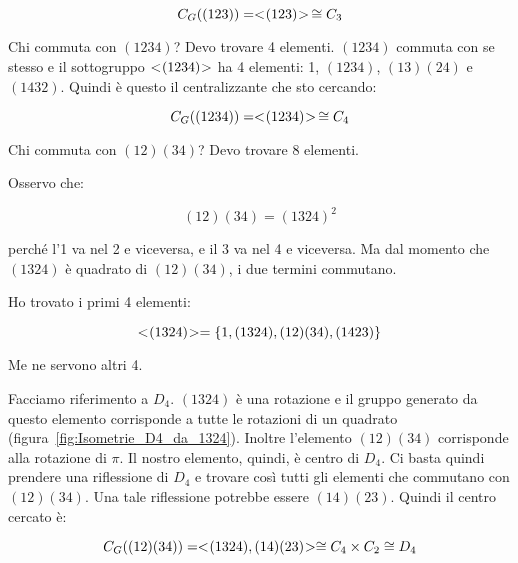 \begin{soluzione}
	\begin{equation}
		C_G((123)) = < \negmedspace (123) \negmedspace > \,\cong C_3
	\end{equation}
	
	Chi commuta con $(1234)$? Devo trovare 4 elementi. $(1234)$ commuta con se stesso e il sottogruppo $< \negmedspace (1234) \negmedspace >$ ha 4 elementi: 1, $(1234)$, $(13)(24)$ e $(1432)$. Quindi è questo il centralizzante che sto cercando:
	
	\begin{equation}
		C_G((1234)) = < \negmedspace (1234) \negmedspace > \,\cong C_4
	\end{equation}
	
	Chi commuta con $(12)(34)$? Devo trovare 8 elementi.
	
	Osservo che:
	
	\begin{equation}
		(12)(34) = (1324)^2
	\end{equation}

	perché l'1 va nel 2 e viceversa, e il 3 va nel 4 e viceversa. Ma dal momento che $(1324)$ è quadrato di $(12)(34)$, i due termini commutano.
	
	Ho trovato i primi 4 elementi:
	
	\begin{equation}
		< \negmedspace (1324) \negmedspace > = \{1, (1324), (12)(34), (1423)\}
	\end{equation}
	
	Me ne servono altri 4.
	
	Facciamo riferimento a $D_4$. $(1324)$ è una rotazione e il gruppo generato da questo elemento corrisponde a tutte le rotazioni di un quadrato (figura~\ref{fig:Isometrie_D4_da_1324}). Inoltre l'elemento $(12)(34)$ corrisponde alla rotazione di $\pi$. Il nostro elemento, quindi, è centro di $D_4$. Ci basta quindi prendere una riflessione di $D_4$ e trovare così tutti gli elementi che commutano con $(12)(34)$. Una tale riflessione potrebbe essere $(14)(23)$. Quindi il centro cercato è:
	
	\begin{equation}
		C_G((12)(34)) = < \negmedspace (1324), (14)(23) \negmedspace > \cong C_4 \times C_2 \cong D_4
	\end{equation}
	
	
\end{soluzione}

